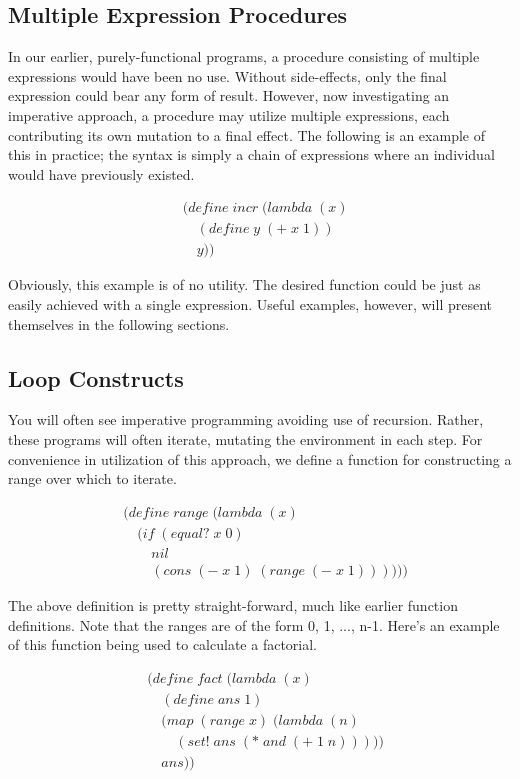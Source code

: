 \subsection{Multiple Expression Procedures}
In our earlier, purely-functional programs, a procedure consisting of multiple 
expressions would have been no use. Without side-effects, only the final expression 
could bear any form of result. However, now investigating an imperative approach, 
a procedure may utilize multiple expressions, each contributing its own mutation to 
a final effect. The following is an example of this in practice; the syntax is 
simply a chain of expressions where an individual would have previously existed.

\begin{align*}
& (define \; incr \; (lambda \; (x)
\\& \quad (define \; y \; (+ \; x \; 1))
\\& \quad y))
\end{align*}

Obviously, this example is of no utility. The desired function could be just as 
easily achieved with a single expression. Useful examples, however, will present 
themselves in the following sections.

\subsection{Loop Constructs}
You will often see imperative programming avoiding use of recursion. Rather, these 
programs will often iterate, mutating the environment in each step. For convenience 
in utilization of this approach, we define a function for constructing a range over 
which to iterate.

\begin{align*}
& (define \; range \; (lambda \; (x)
\\& \quad (if \; (equal? \; x \; 0)
\\& \qquad nil
\\& \qquad (cons \; (- \; x \; 1) \; (range \; (- \; x \; 1))))))
\end{align*}

The above definition is pretty straight-forward, much like earlier function 
definitions. Note that the ranges are of the form 0, 1, ..., n-1. Here's an example 
of this function being used to calculate a factorial.

\begin{align*}
& (define \; fact \; (lambda \; (x)
\\& \quad (define \; ans \; 1)
\\& \quad (map \; (range \; x) \; (lambda \; (n)
\\& \qquad (set! \; ans \; (* \; and \; (+ \; 1 \; n)))))
\\& \quad ans))
\end{align*}

